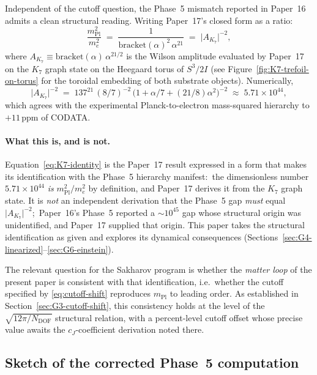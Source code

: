 \documentclass[11pt]{article}
\newcommand{\mPl}{m_{\mathrm{Pl}}}
\newcommand{\me}{m_e}
\begin{document}
Independent of the cutoff question, the Phase~5 mismatch reported
in Paper~16 admits a clean structural reading.  Writing
Paper~17's closed form as a ratio:
\begin{equation}
  \frac{\mPl^2}{\me^2}
   \;=\;
   \frac{1}{\mathrm{bracket}(\alpha)^2\,\alpha^{21}}
   \;=\;
   \big|A_{K_7}\big|^{-2},
  \label{eq:K7-identity}
\end{equation}
where $A_{K_7} \equiv \mathrm{bracket}(\alpha)\,\alpha^{21/2}$ is
the Wilson amplitude evaluated by Paper~17 on the $K_7$ graph state
on the Heegaard torus of $S^3/2I$ (see
Figure~\ref{fig:K7-trefoil-on-torus} for the toroidal embedding of
both substrate objects).  Numerically,
\begin{equation}
  \big|A_{K_7}\big|^{-2}
   \;=\;
   137^{21}\,(8/7)^{-2}\,\bigl(1+\alpha/7+(21/8)\alpha^2\bigr)^{-2}
   \;\approx\;
   5.71 \times 10^{44},
  \label{eq:hierarchy-numeric}
\end{equation}
which agrees with the experimental Planck-to-electron mass-squared
hierarchy to $+11$\,ppm of CODATA.

\paragraph{What this is, and is not.}
Equation~\eqref{eq:K7-identity} is the Paper~17 result expressed in
a form that makes its identification with the Phase~5 hierarchy
manifest:\ the dimensionless number $5.71 \times 10^{44}$ \emph{is}
$\mPl^2/\me^2$ by definition, and Paper~17 derives it from the
$K_7$ graph state.  It is \emph{not} an independent derivation that the
Phase~5 gap \emph{must} equal $\big|A_{K_7}\big|^{-2}$;\ Paper~16's
Phase~5 reported a $\sim 10^{45}$ gap whose structural origin was
unidentified, and Paper~17 supplied that origin.  This paper takes
the structural identification as given and explores its dynamical
consequences (Sections~\ref{sec:G4-linearized}--\ref{sec:G6-einstein}).

The relevant question for the Sakharov program is whether the
\emph{matter loop} of the present paper is consistent with that
identification, i.e.\ whether the cutoff specified by
\eqref{eq:cutoff-shift} reproduces $\mPl$ to leading order.  As
established in Section~\ref{sec:G3-cutoff-shift}, this consistency
holds at the level of the $\sqrt{12\pi/N_{\mathrm{DOF}}}$ structural
relation, with a percent-level cutoff offset whose precise value
awaits the $c_J$-coefficient derivation noted there.

\subsection{Sketch of the corrected Phase~5 computation}
\label{sec:G3-phase5-sketch}
\end{document}
